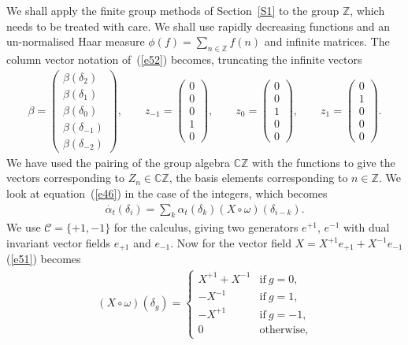 \documentclass[pdftex]{sigma}
\numberwithin{equation}{section}
\newcommand{\C}{\mathbb{C}}
\newcommand{\Z}{\mathbb{Z}}
\newcommand{\<}{\langle}
\renewcommand{\>}{\rangle}
\begin{document}
We shall apply the finite group methods of Section~\ref{S1} to the group $ \Z $, which needs to be treated with care. We shall use rapidly decreasing functions and an un-normalised Haar measure $ \phi(f) =\sum_{n\in \Z} f(n)$ and infinite matrices. The column vector notation of~(\ref{e52}) becomes, truncating the infinite vectors
\begin{gather}\label{e69}
\beta= \left( \begin{matrix}
\beta(\delta_{2})\\
\beta(\delta_{1})\\
\beta(\delta_{0})\\
\beta(\delta_{-1})\\
\beta(\delta_{-2})
\end{matrix} \right), \qquad {z_{-1}}=\left( \begin{matrix}
0\\
0\\
0\\
1\\
0
\end{matrix}
\right),\qquad {z_0}=\left( \begin{matrix}
0\\
0\\
1\\
0\\
0
\end{matrix}
\right),\qquad {z_1}=\left( \begin{matrix}
0\\
1\\
0\\
0\\
0
\end{matrix}
\right).
\end{gather}
We have used the pairing of the group algebra $ \C \Z $ with the functions to give the vectors corresponding to $ Z_{n}\in \C \Z $, the basis elements corresponding to $ n\in \Z $.
We look at equation~(\ref{e46}) in the case of the integers, which becomes
\begin{align}\label{e63}
\dot{\alpha_t}(\delta_{i})=\sum_{k}\alpha_t (\delta_{k}) (X \circ \omega)(\delta_{i-k}).
\end{align}
We use $ \mathcal{C}=\{+1,-1\} $ for the calculus, giving two generators $ e^{+1}$, $e^{-1} $ with dual invariant vector fields $ e_{+1}$ and $ e_{-1} $. Now for the vector field $ X =X^{+1}e_{+1}+X^{-1}e_{-1}$ (\ref{e51}) becomes
\begin{gather*}
(X \circ \omega)(\delta_{g})=\begin{cases}
X^{+1} +X^{-1} & \mbox{if} \ g=0, \\
- X^{-1} & \mbox{if}\ g=1,\\
- X^{+1} & \mbox{if}\ g=-1,\\
0 & \mbox{otherwise},
\end{cases}
\end{gather*}
\end{document}
